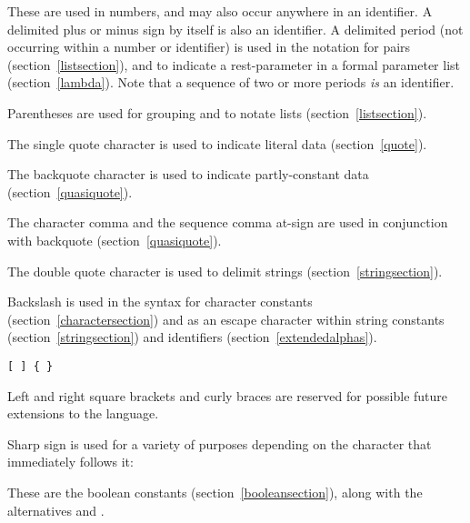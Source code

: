 \begin{description}{}{}

\item[{\tt.\ + -}]
These are used in numbers, and may also occur anywhere in an identifier.
A delimited plus or minus sign by itself
is also an identifier.
A delimited period (not occurring within a number or identifier) is used
in the notation for pairs (section~\ref{listsection}), and to indicate a
rest-parameter in a  formal parameter list (section~\ref{lambda}).
Note that a sequence of two or more periods {\em is} an identifier.

\item[\tt( )]
Parentheses are used for grouping and to notate lists
(section~\ref{listsection}).

\item[\singlequote]
The single quote character is used to indicate literal data (section~\ref{quote}).

\item[\backquote]
The backquote character is used to indicate partly-constant
data (section~\ref{quasiquote}).

\item[\tt, ,@]
The character comma and the sequence comma at-sign are used in conjunction
with backquote (section~\ref{quasiquote}).

\item[\tt"]
The double quote character is used to delimit strings (section~\ref{stringsection}).

\item[\backwhack]
Backslash is used in the syntax for character constants
(section~\ref{charactersection}) and as an escape character within string
constants (section~\ref{stringsection}) and identifiers
(section~\ref{extendedalphas}).

\hbox{\tt \verb"[" \verb"]" \verb"{" \verb"}"}
\item[\copy0]
Left and right square brackets and curly braces
are reserved for possible future extensions to the language.

\item[\sharpsign] Sharp sign is used for a variety of purposes depending on
the character that immediately follows it:

\item[\schtrue{} \schfalse{}]
These are the boolean constants (section~\ref{booleansection}),
along with the alternatives  and .


\end{description}
